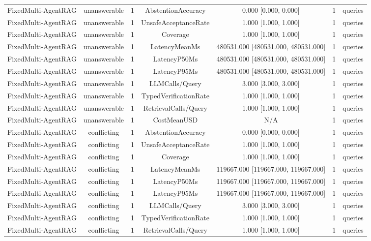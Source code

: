 {\begin{tabular}{lcccccc}
FixedMulti-AgentRAG & unanswerable & 1 & AbstentionAccuracy & 0.000 [0.000, 0.000] & 1 & queries \\
FixedMulti-AgentRAG & unanswerable & 1 & UnsafeAcceptanceRate & 1.000 [1.000, 1.000] & 1 & queries \\
FixedMulti-AgentRAG & unanswerable & 1 & Coverage & 1.000 [1.000, 1.000] & 1 & queries \\
FixedMulti-AgentRAG & unanswerable & 1 & LatencyMeanMs & 480531.000 [480531.000, 480531.000] & 1 & queries \\
FixedMulti-AgentRAG & unanswerable & 1 & LatencyP50Ms & 480531.000 [480531.000, 480531.000] & 1 & queries \\
FixedMulti-AgentRAG & unanswerable & 1 & LatencyP95Ms & 480531.000 [480531.000, 480531.000] & 1 & queries \\
FixedMulti-AgentRAG & unanswerable & 1 & LLMCalls/Query & 3.000 [3.000, 3.000] & 1 & queries \\
FixedMulti-AgentRAG & unanswerable & 1 & TypedVerificationRate & 1.000 [1.000, 1.000] & 1 & queries \\
FixedMulti-AgentRAG & unanswerable & 1 & RetrievalCalls/Query & 1.000 [1.000, 1.000] & 1 & queries \\
FixedMulti-AgentRAG & unanswerable & 1 & CostMeanUSD & N/A & 1 & queries \\
FixedMulti-AgentRAG & conflicting & 1 & AbstentionAccuracy & 0.000 [0.000, 0.000] & 1 & queries \\
FixedMulti-AgentRAG & conflicting & 1 & UnsafeAcceptanceRate & 1.000 [1.000, 1.000] & 1 & queries \\
FixedMulti-AgentRAG & conflicting & 1 & Coverage & 1.000 [1.000, 1.000] & 1 & queries \\
FixedMulti-AgentRAG & conflicting & 1 & LatencyMeanMs & 119667.000 [119667.000, 119667.000] & 1 & queries \\
FixedMulti-AgentRAG & conflicting & 1 & LatencyP50Ms & 119667.000 [119667.000, 119667.000] & 1 & queries \\
FixedMulti-AgentRAG & conflicting & 1 & LatencyP95Ms & 119667.000 [119667.000, 119667.000] & 1 & queries \\
FixedMulti-AgentRAG & conflicting & 1 & LLMCalls/Query & 3.000 [3.000, 3.000] & 1 & queries \\
FixedMulti-AgentRAG & conflicting & 1 & TypedVerificationRate & 1.000 [1.000, 1.000] & 1 & queries \\
FixedMulti-AgentRAG & conflicting & 1 & RetrievalCalls/Query & 1.000 [1.000, 1.000] & 1 & queries \\

\end{tabular}}
